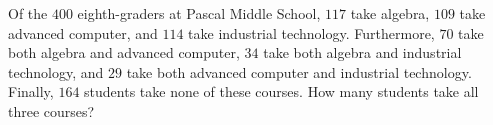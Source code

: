 Of the $400$ eighth-graders at Pascal Middle School, $117$ take algebra, $109$ take advanced computer, and $114$ take industrial technology. Furthermore, $70$ take both algebra and advanced computer, $34$ take both algebra and industrial technology, and $29$ take both advanced computer and industrial technology. Finally, $164$ students take none of these courses. How many students take all three courses?
